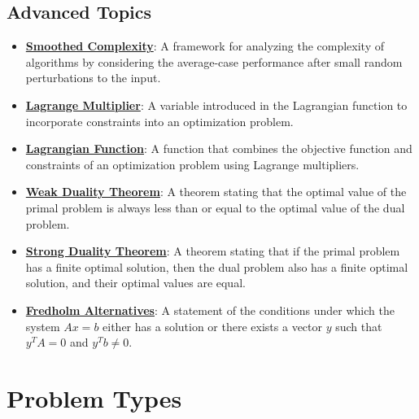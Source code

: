 \documentclass{article}%
\begin{document}
\subsection{Advanced Topics}%
\label{subsec:AdvancedTopics}%
\begin{itemize}[leftmargin=*]%
\item \href{https://www.math.purdue.edu/~yipn/421//2024-09-05-SimplexEfficiency.pdf#page=11}{\textbf{Smoothed Complexity}}: A framework for analyzing the complexity of algorithms by considering the average-case performance after small random perturbations to the input.%
\item \href{https://www.math.purdue.edu/~yipn/421//2024-09-17-DualityGeneral.pdf#page=2}{\textbf{Lagrange Multiplier}}: A variable introduced in the Lagrangian function to incorporate constraints into an optimization problem.%
\item \href{https://www.math.purdue.edu/~yipn/421//2024-09-17-DualityGeneral.pdf#page=2}{\textbf{Lagrangian Function}}: A function that combines the objective function and constraints of an optimization problem using Lagrange multipliers.%
\item \href{https://www.math.purdue.edu/~yipn/421//2024-09-17-DualityGeneral.pdf#page=5}{\textbf{Weak Duality Theorem}}: A theorem stating that the optimal value of the primal problem is always less than or equal to the optimal value of the dual problem.%
\item \href{https://www.math.purdue.edu/~yipn/421//2024-09-17-DualityGeneral.pdf#page=17}{\textbf{Strong Duality Theorem}}: A theorem stating that if the primal problem has a finite optimal solution, then the dual problem also has a finite optimal solution, and their optimal values are equal.%
\item \href{https://www.math.purdue.edu/~yipn/421//2024-10-28-Farkas.pdf#page=3}{\textbf{Fredholm Alternatives}}: A statement of the conditions under which the system $Ax = b$ either has a solution or there exists a vector $y$ such that $y^T A = 0$ and $y^T b \neq 0$.%
\end{itemize}

%
\section{Problem Types}%
\label{sec:ProblemTypes}%
\end{document}
